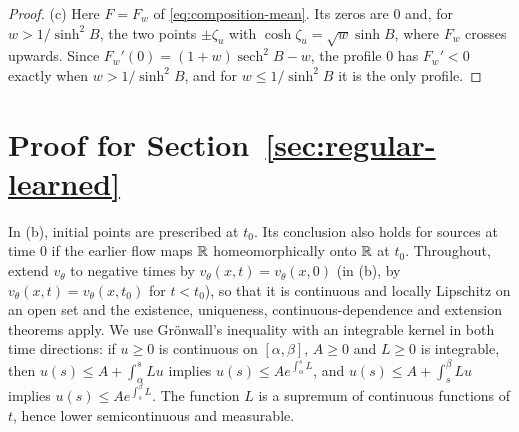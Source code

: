 \documentclass{article} %
\makeatletter
\newif\ificlr
\newcommand{\placeblock}[1]{\ificlr\@nameuse{moved@#1}\fi}
\theoremstyle{plain}
\theoremstyle{definition}
\theoremstyle{remark}
\makeatother
\begin{document}
\begin{proof}
(c) Here $F=F_w$ of \eqref{eq:composition-mean}. Its zeros are $0$ and, for $w>1/\sinh^2B$, the
two points $\pm \zeta_u$ with $\cosh \zeta_u=\sqrt w\sinh B$, where $F_w$ crosses upwards. Since
$F_w'(0)=(1+w)\operatorname{sech}^2B-w$, the profile $0$ has $F_w'<0$ exactly when
$w>1/\sinh^2B$, and for $w\le1/\sinh^2B$ it is the only profile.
\end{proof}

\section{Proof for Section~\ref{sec:regular-learned}}
\label{app:regular}
\label{apx:pf-regular}

\ificlr\placeblock{regular}\else\propregular*\fi
In (b), initial points are prescribed at $t_0$. Its conclusion also holds for sources at time
$0$ if the earlier flow maps $\mathbb{R}$ homeomorphically onto $\mathbb{R}$ at $t_0$.
Throughout, extend $v_\theta$ to negative times by $v_\theta(x,t)=v_\theta(x,0)$ (in (b), by
$v_\theta(x,t)=v_\theta(x,t_0)$ for $t<t_0$), so that it is continuous and locally Lipschitz on an
open set and the existence, uniqueness, continuous-dependence and extension theorems apply. We
use Gr\"onwall's inequality with an integrable kernel in both time directions: if $u\ge0$ is
continuous on $[\alpha,\beta]$, $A\ge0$ and $L\ge0$ is integrable, then
$u(s)\le A+\int_\alpha^sLu$ implies $u(s)\le Ae^{\int_\alpha^sL}$, and $u(s)\le A+\int_s^\beta Lu$
implies $u(s)\le Ae^{\int_s^\beta L}$. The function $L$ is a supremum of continuous functions of
$t$, hence lower semicontinuous and measurable.
\end{document}

